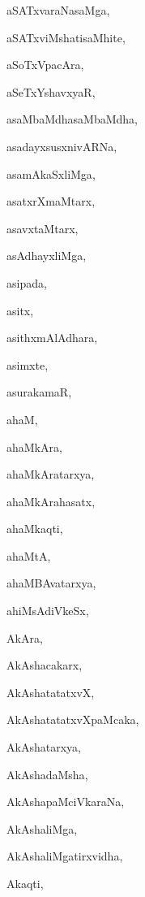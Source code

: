 \begin{multicols}{2}
{aSATxvaraNasaMga}, \pageref{aSATxvaraNasaMga}

{aSATxviMshatisaMhite}, \pageref{aSATxviMshatisaMhite}

{aSoTxVpacAra}, \pageref{aSoTxVpacAra}

{aSeTxYshavxyaR}, \pageref{aSeTxYshavxyaR}

{asaMbaMdhasaMbaMdha}, \pageref{asaMbaMdhasaMbaMdha}

{asadayxsusxnivARNa}, \pageref{asadayxsusxnivARNa}

{asamAkaSxliMga}, \pageref{asamAkaSxliMga}

{asatxrXmaMtarx}, \pageref{asatxrXmaMtarx}

{asavxtaMtarx}, \pageref{asavxtaMtarx}

{asAdhayxliMga}, \pageref{asAdhayxliMga}

{asipada}, \pageref{asipada}

{asitx}, \pageref{asitx}

{asithxmAlAdhara}, \pageref{asithxmAlAdhara}

{asimxte}, \pageref{asimxte}

{asurakamaR}, \pageref{asurakamaR}

{ahaM}, \pageref{ahaM}

{ahaMkAra}, \pageref{ahaMkAra}

{ahaMkAratarxya}, \pageref{ahaMkAratarxya}

{ahaMkArahasatx}, \pageref{ahaMkArahasatx}

{ahaMkaqti}, \pageref{ahaMkaqti}

{ahaMtA}, \pageref{ahaMtA}

{ahaMBAvatarxya}, \pageref{ahaMBAvatarxya}

{ahiMsAdiVkeSx}, \pageref{ahiMsAdiVkeSx}

{AkAra}, \pageref{AkAra}

{AkAshacakarx}, \pageref{AkAshacakarx}

{AkAshatatatxvX}, \pageref{AkAshatatatxvX}

{AkAshatatatxvXpaMcaka}, \pageref{AkAshatatatxvXpaMcaka}

{AkAshatarxya}, \pageref{AkAshatarxya}

{AkAshadaMsha}, \pageref{AkAshadaMsha}

{AkAshapaMciVkaraNa}, \pageref{AkAshapaMciVkaraNa}

{AkAshaliMga}, \pageref{AkAshaliMga}

{AkAshaliMgatirxvidha}, \pageref{AkAshaliMgatirxvidha}

{Akaqti}, \pageref{Akaqti}


\end{multicols}
